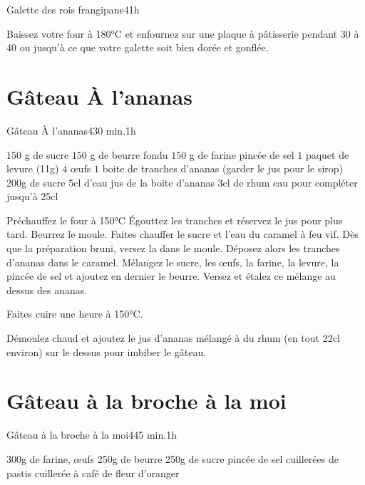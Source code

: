 {\begin{recette}{Galette des rois frangipane}{4}{}{1h}
\begin{preparation}
\end{preparation}

\begin{cuisson}
Baissez votre four à 180°C et enfournez sur une plaque à pâtisserie pendant 30 à 40 ou jusqu’à ce que votre galette soit bien dorée et gonflée.
\end{cuisson}
\end{recette}

\section{Gâteau À l'ananas}
\begin{recette}{Gâteau À l'ananas}{4}{30 min.}{1h}
\begin{ingredients}
\ingredient[gâteau]
\ingredient $150$ g de sucre
\ingredient $150$ g de beurre fondu
\ingredient $150$ g de farine
 pincée de sel
\ingredient $1$ paquet de levure (11g)
\ingredient $4$ œufs
\ingredient $1$ boite de tranches d'ananas (garder le jus pour le sirop)
\ingredient[caramel]
\ingredient 200g de sucre
\ingredient 5cl d'eau
\ingredient jus de la boite d'ananas
\ingredient 3cl de rhum
\ingredient eau pour compléter jusqu'à 25cl
\end{ingredients}

\begin{preparation}
\etape Préchauffez le four à 150°C
\etape Égouttez les tranches et réservez le jus pour plus tard.
\etape Beurrez le moule. 
\etape Faites chauffer le sucre et l'eau du caramel à feu vif. Dès que la préparation bruni, versez la dans le moule. 
\etape Déposez alors les tranches d'ananas dans le caramel.
\etape Mélangez le sucre, les œufs, la farine, la levure, la pincée de sel et ajoutez en dernier le beurre.
\etape Versez et étalez ce mélange au dessus des ananas.
\end{preparation}

\begin{cuisson}
Faites cuire une heure à 150°C.

Démoulez chaud et ajoutez le jus d'ananas mélangé à du rhum (en tout 22cl environ) sur le dessus pour imbiber le gâteau.
\end{cuisson}
\end{recette}

\section{Gâteau à la broche à la moi}
\begin{recette}{Gâteau à la broche à la moi}{4}{45 min.}{1h}
\begin{ingredients}
\ingredient 300g de farine,
 œufs
\ingredient 250g de beurre
\ingredient 250g de sucre
 pincée de sel
 cuillerées de pastis
 cuillerée à café de fleur d’oranger
\end{ingredients}


\end{recette}}

